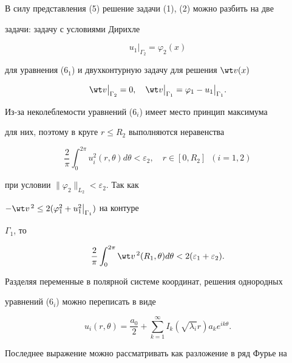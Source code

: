  


\begin{pf} 


В силу представления (5) решение задачи (1), (2) можно разбить на две 


задачи: задачу с условиями Дирихле 


$$ 


u_1\big|_{\Gamma_2}=\varphi_2(x)


$$ 


для уравнения (6${}_1$) и двухконтурную задачу для решения $\wt v(x)$ 


$$ 


\wt v\big|_{\Gamma_2}=0,\quad 


\wt v\big|_{\Gamma_1}=\varphi_1-u_1\big|_{\Gamma_1}. 


$$ 


 


Из-за неколеблемости уравнений (6${}_i$) имеет место принцип максимума 


для них, поэтому в круге $r\le R_2$ выполняются неравенства 


$$ 


\frac{2}{\pi}\int^{2\pi}_0u^2_i(r,\theta)d\theta<\varepsilon_2, 


\quad r\in[0,R_2]\ \; (i=1,2)


$$ 


при условии $\|\varphi_2\|_{L_2}<\varepsilon_2$. Так как 


$-\wt v^{\,2}\le 2(\varphi^2_1+u^2_1\big|_{\Gamma_1})$ на контуре 


$\Gamma_1$, то 


\begin{equation} 


\frac{2}{\pi}\int^{2\pi}_0\wt v^{\,2}(R_1,\theta)d\theta 


<2(\varepsilon_1+\varepsilon_2). 


\end{equation} 


Разделяя переменные в полярной системе координат, решения однородных 


уравнений (6${}_i$) можно переписать в виде 


$$ 


u_i(r,\theta)=\frac{a_0}{2}+\sum^\infty_{k=1} 


I_k(\sqrt{\lambda_i}r)a_k e^{ik\theta}. 


$$ 


Последнее выражение можно рассматривать как разложение в ряд Фурье на 



\end{pf}
